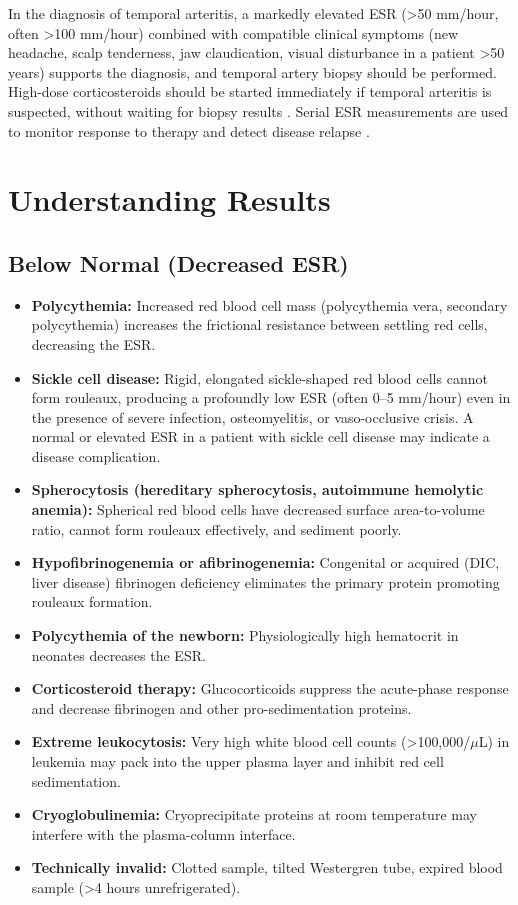 In the diagnosis of temporal arteritis, a markedly elevated ESR (>50 mm/hour, often >100 mm/hour) combined with compatible clinical symptoms (new headache, scalp tenderness, jaw claudication, visual disturbance in a patient >50 years) supports the diagnosis, and temporal artery biopsy should be performed. High-dose corticosteroids should be started immediately if temporal arteritis is suspected, without waiting for biopsy results \cite{salvarani2008polymyalgia}. Serial ESR measurements are used to monitor response to therapy and detect disease relapse \cite{tierney2023current}.

\section*{Understanding Results}

\subsection*{Below Normal (Decreased ESR)}
\begin{itemize}
  \item \textbf{Polycythemia:} Increased red blood cell mass (polycythemia vera, secondary polycythemia) increases the frictional resistance between settling red cells, decreasing the ESR.
  \item \textbf{Sickle cell disease:} Rigid, elongated sickle-shaped red blood cells cannot form rouleaux, producing a profoundly low ESR (often 0--5 mm/hour) even in the presence of severe infection, osteomyelitis, or vaso-occlusive crisis. A normal or elevated ESR in a patient with sickle cell disease may indicate a disease complication.
  \item \textbf{Spherocytosis (hereditary spherocytosis, autoimmune hemolytic anemia):} Spherical red blood cells have decreased surface area-to-volume ratio, cannot form rouleaux effectively, and sediment poorly.
  \item \textbf{Hypofibrinogenemia or afibrinogenemia:} Congenital or acquired (DIC, liver disease) fibrinogen deficiency eliminates the primary protein promoting rouleaux formation.
  \item \textbf{Polycythemia of the newborn:} Physiologically high hematocrit in neonates decreases the ESR.
  \item \textbf{Corticosteroid therapy:} Glucocorticoids suppress the acute-phase response and decrease fibrinogen and other pro-sedimentation proteins.
  \item \textbf{Extreme leukocytosis:} Very high white blood cell counts (>100,000/$\mu$L) in leukemia may pack into the upper plasma layer and inhibit red cell sedimentation.
  \item \textbf{Cryoglobulinemia:} Cryoprecipitate proteins at room temperature may interfere with the plasma-column interface.
  \item \textbf{Technically invalid:} Clotted sample, tilted Westergren tube, expired blood sample (>4 hours unrefrigerated).
\end{itemize}

